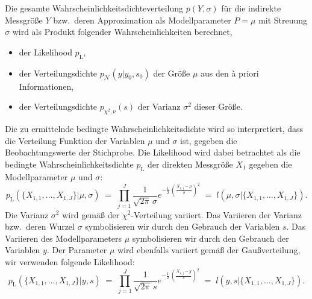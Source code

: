 Die gesamte Wahrscheinlichkeitsdichteverteilung $p(Y,\sigma)$ für die indirekte Messgröße
$Y$ bzw.\ deren Approximation als Modellparameter $P = \mu$ mit Streuung $\sigma$ wird als Produkt
folgender Wahrscheinlichkeiten berechnet,
\begin{itemize}
\item der Likelihood $p_\mathrm{L}$,
\item der Verteilungsdichte $p_\mathcal{N}(y | y_0, s_0)$ der Größe $\mu$ aus den {\`a} priori Informationen,
\item der Verteilungsdichte $p_{\chi^2,\nu}(s)$ der Varianz $\sigma^2$ dieser Größe.
\end{itemize}
Die zu ermittelnde bedingte Wahrscheinlichkeitsdichte wird so interpretiert, dass die Verteilung Funktion
der Variablen $\mu$ und $\sigma$ ist, gegeben die Beobachtungswerte der Stichprobe. Die Likelihood wird
dabei betrachtet als die bedingte Wahrscheinlichkeitsdichte $p_\mathrm{L}$ der
direkten Messgröße $X_1$ gegeben die Modellparameter $\mu$ und $\sigma$:
\begin{equation}
p_\mathrm{L}(\{X_{1,1}, \dots, X_{1,J}\} | \mu, \sigma) \; = \;
\prod\limits_{j=1}^J \frac{1}{\sqrt{2 \pi} \, \sigma}
 e^{- \frac{1}{2} \, \left( \frac{X_{1,j} - \mu}{\sigma} \right)^2 }  \; = \;
l(\mu, \sigma | \{X_{1,1}, \dots, X_{1,J}\}).
\end{equation}
Die Varianz $\sigma^2$ wird gemäß der $\chi^2$-Verteilung variiert. Das Variieren der Varianz
bzw.\ deren Wurzel $\sigma$ symbolisieren wir durch den Gebrauch der Variablen $s$.
Das Variieren des Modellparameters $\mu$ symbolisieren wir durch den Gebrauch der Variablen $y$.
Der Parameter $\mu$ wird ebenfalls variiert gemäß der Gaußverteilung, wir verwenden folgende
Likelihood:
\begin{equation}
p_\mathrm{L}(\{X_{1,1}, \dots, X_{1,J}\} | y, s) \; = \;
\prod\limits_{j=1}^J \frac{1}{\sqrt{2 \pi} \, s}
 e^{- \frac{1}{2} \, \left( \frac{X_{1,j} - y}{s} \right)^2 }  \; = \;
l(y, s | \{X_{1,1}, \dots, X_{1,J}\}).
\end{equation}

